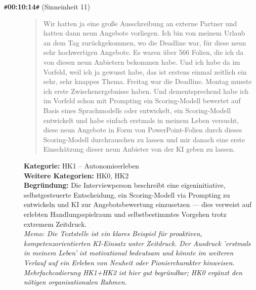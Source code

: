 \begin{description}
  \item[\texttt{\#}\textbf{00:10:14}\texttt{\#} (Sinneinheit 11)]
  \begin{quote}
  Wir hatten ja eine große Ausschreibung an externe Partner und hatten dann neun Angebote vorliegen. Ich bin von meinem Urlaub an dem Tag zurückgekommen, wo die Deadline war, für diese neun sehr hochwertigen Angebote. Es waren über 566 Folien, die ich da von diesen neun Anbietern bekommen habe. Und ich habe da im Vorfeld, weil ich ja gewusst habe, das ist erstens einmal zeitlich ein sehr, sehr knappes Thema. Freitag war die Deadline. Montag musste ich erste Zwischenergebnisse haben. Und dementsprechend habe ich im Vorfeld schon mit Prompting ein Scoring-Modell bewertet auf Basis eines Sprachmodells oder entwickelt, ein Scoring-Modell entwickelt und habe einfach erstmals in meinem Leben versucht, diese neun Angebote in Form von PowerPoint-Folien durch dieses Scoring-Modell durchrauschen zu lassen und mir danach eine erste Einschätzung dieser neun Anbieter von der KI geben zu lassen.
  \end{quote}
  \textbf{Kategorie:} HK1 -- Autonomieerleben\\
  \textbf{Weitere Kategorien:} HK0, HK2\\
  \textbf{Begr\"undung:} Die Interviewperson beschreibt eine eigeninitiative, selbstgesteuerte Entscheidung, ein Scoring-Modell via Prompting zu entwickeln und KI zur Angebotsbewertung einzusetzen — dies verweist auf erlebten Handlungsspielraum und selbstbestimmtes Vorgehen trotz extremem Zeitdruck.
  \\\textit{Memo: Die Textstelle ist ein klares Beispiel für proaktiven, kompetenzorientierten KI-Einsatz unter Zeitdruck. Der Ausdruck 'erstmals in meinem Leben' ist motivational bedeutsam und könnte im weiteren Verlauf auf ein Erleben von Neuheit oder Pioniercharakter hinweisen. Mehrfachcodierung HK1+HK2 ist hier gut begründbar; HK0 ergänzt den nötigen organisationalen Rahmen.}
\end{description}
\medskip

